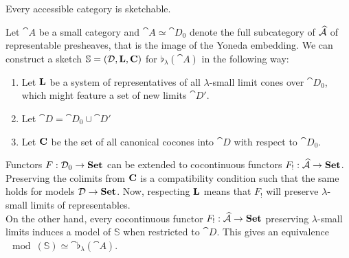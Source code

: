 \begin{Theorem}
Every accessible category is sketchable.
\end{Theorem}
\begin{Proof}
Let $\cat A$ be a small category and $\cat A \simeq \cat D_0$ denote the full subcategory of $\widehat{\mathcal{A}}$ of representable presheaves, that is the image of the Yoneda embedding. We can construct a sketch $\mathbb S = (\mathcal{D}, \textbf{L}, \textbf{C})$ for $\flat_\lambda(\cat A)$ in the following way:

\begin{enumerate}
\item Let $\textbf{L}$ be a system of representatives of all $\lambda$-small limit cones over $\cat D_0$, which might feature a set of new limits $\cat D'$.
\item Let $\cat D = \cat D_0 \cup \cat D'$
\item Let $\textbf{C}$ be the set of all canonical cocones into $\cat D$ with respect to $\cat D_0$.
\end{enumerate}

Functors $F : \mathcal{D}_0 \to \mathbf{Set}$ can be extended to cocontinuous functors $F_! : \widehat{\mathcal{A}} \to \mathbf{Set}$. Preserving the colimits from $\textbf{C}$ is a compatibility condition such that the same holds for models $\mathcal{D} \to \mathbf{Set}$. Now, respecting $\textbf{L}$ means that $F_!$ will preserve $\lambda$-small limits of representables. \\

On the other hand, every cocontinuous functor $F_! : \widehat{\mathcal{A}} \to \mathbf{Set}$ preserving $\lambda$-small limits induces a model of $\mathbb S$ when restricted to $\cat D$. This gives an equivalence $\mod(\mathbb S) \simeq \cat \flat_\lambda(\cat A)$.
\end{Proof}

